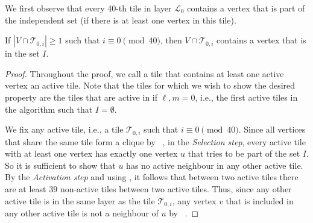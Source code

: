 \documentclass[letterpaper,11pt]{article}
\newcommand{\1}{\mathbb I}
\newcommand{\Layer}[1]{\mathcal{L}_{#1}}
\newcommand{\tiletile}[2]{\mathcal{T}_{#1,#2}}
\begin{document}
%
We first observe that every 40-th tile in layer $\Layer{0}$ contains a vertex that is part of the independent set (if there is at least one vertex in this tile). 
%
\begin{observation}\label{obs:tile-layer0}
If $|V \cap \tiletile{0}{i}| \geq 1$ such that $i \equiv 0 \pmod{40}$, then $V \cap \tiletile{0}{i}$ contains a vertex that is in the set $I$.
\end{observation}
%
\begin{proof}
    Throughout the proof, we call a tile that contains at least one active vertex an active tile. Note that the tiles for which we wish to show the desired property are the tiles that are active in \algomis if $\ell, m = 0$, i.e., the first active tiles in the algorithm such that $I = \emptyset$.

    We fix any active tile, i.e., a tile $\tiletile{0}{i}$ such that $i \equiv 0 \pmod{40}$. Since all vertices that share the same tile form a clique by ~, in the \emph{Selection step}, every active tile with at least one vertex has exactly one vertex $u$ that tries to be part of the set $I$. So it is sufficient to show that $u$ has no active neighbour in any other active tile. By the \emph{Activation step} and using , it follows that between two active tiles there are at least $39$ non-active tiles between two active tiles. Thus, since any other active tile is in the same layer as the tile $\tiletile{0}{i}$, any vertex $v$ that is included in any other active tile is not a neighbour of $u$ by ~. 
\end{proof}
\end{document}

